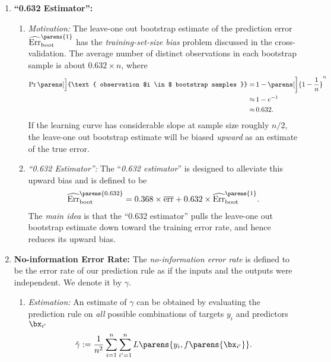 \documentclass[12pt]{article}
\begin{document}
\begin{enumerate}[label=\textbf{\arabic*.}]
	\item \textbf{``0.632 Estimator'':} 
	\begin{enumerate}
		\item \textit{Motivation:} The leave-one out bootstrap estimate of the prediction error $\widehat{\mathrm{Err}}_{\mathrm{boot}}^{\parens{1}}$ has the \textit{training-set-size bias} problem discussed in the cross-validation. The average number of distinct observations in each bootstrap sample is about $0.632 \times n$, where 
		\begin{align*}
			\Pr \parens[\Big]{\text{ observation $i \in $ bootstrap samples }} = & \, 1 - \parens[\bigg]{1 - \frac{1}{n}}^n \\ 
			\approx & \, 1 - e^{-1} \\ 
			\approx & \, 0.632. 
		\end{align*}
		If the learning curve has considerable slope at sample size roughly $n/2$, the leave-one out bootstrap estimate will be biased \textit{upward} as an estimate of the true error. 
		
		\item \textit{``0.632 Estimator'':} The ``\textit{0.632 estimator}'' is designed to alleviate this upward bias and is defined to be 
		\begin{align}
			\widehat{\mathrm{Err}}_{\mathrm{boot}}^{\parens{0.632}} = 0.368 \times \overline{\mathrm{err}} + 0.632 \times \widehat{\mathrm{Err}}_{\mathrm{boot}}^{\parens{1}}. 
		\end{align}
		The \textit{main idea} is that the ``0.632 estimator'' pulls the leave-one out bootstrap estimate down toward the training error rate, and hence reduces its upward bias. 
	\end{enumerate}
	
	\item \textbf{No-information Error Rate:} The \textit{no-information error rate} is defined to be the error rate of our prediction rule as if the inputs and the outputs were independent. We denote it by $\gamma$. 
	
	\begin{enumerate}
		\item \textit{Estimation:} An estimate of $\gamma$ can be obtained by evaluating the prediction rule on \emph{all} possible combinations of targets $y_i$ and predictors $\bx_{i'}$ 
		\begin{align}
			\hat{\gamma} := \frac{1}{n^2} \sum_{i=1}^n \sum_{i'=1}^n L \parens{y_i, f \parens{\bx_{i'}}}. 
		\end{align}
		

\end{enumerate}
\end{enumerate}
\end{document}
